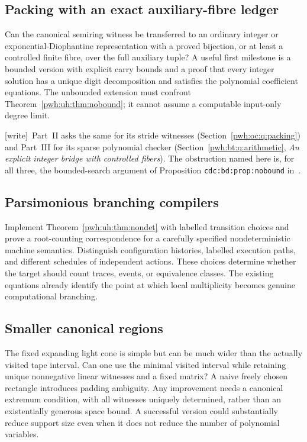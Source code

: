 \documentclass[11pt,letterpaper]{article}
\numberwithin{equation}{section}
\theoremstyle{definition}
\newcommand{\wtag}{\textup{[write]}}
\begin{document}
\subsection{Packing with an exact auxiliary-fibre ledger}\label{pwh:uh:q:packing}

Can the canonical semiring witness be transferred to an ordinary integer
or exponential-Diophantine representation with a proved bijection, or at
least a controlled finite fibre, over the full auxiliary tuple? A useful
first milestone is a bounded version with explicit carry bounds and a
proof that every integer solution has a unique digit decomposition and
satisfies the polynomial coefficient equations. The unbounded extension
must confront Theorem~\ref{pwh:uh:thm:nobound}; it cannot assume a computable
input-only degree limit.

\wtag\ Part~II asks the same for its stride witnesses
(Section~\ref{pwh:oc:q:packing}) and Part~III for its sparse polynomial
checker (Section~\ref{pwh:bt:q:arithmetic}, \emph{An explicit integer bridge
with controlled fibers}). The obstruction named here is, for all three,
the bounded-search argument of Proposition \texttt{cdc:bd:prop:nobound}
in~\cite{cdc}.

\subsection{Parsimonious branching compilers}

Implement Theorem~\ref{pwh:uh:thm:nondet} with labelled transition choices and
prove a root-counting correspondence for a carefully specified
nondeterministic machine semantics. Distinguish configuration histories,
labelled execution paths, and different schedules of independent actions.
These choices determine whether the target should count traces, events,
or equivalence classes. The existing equations already identify the point
at which local multiplicity becomes genuine computational branching.

\subsection{Smaller canonical regions}

The fixed expanding light cone is simple but can be much wider than the
actually visited tape interval. Can one use the minimal visited interval
while retaining unique nonnegative linear witnesses and a fixed matrix?
A naive freely chosen rectangle introduces padding ambiguity. Any
improvement needs a canonical extremum condition, with all witnesses
uniquely determined, rather than an existentially generous space bound.
A successful version could substantially reduce support size even when
it does not reduce the number of polynomial variables.
\end{document}
